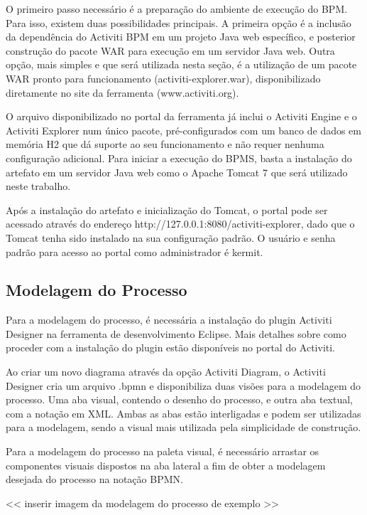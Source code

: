 O primeiro passo necessário é a preparação do ambiente de execução do BPM. Para isso, existem duas possibilidades principais. A primeira opção é a inclusão da dependência do Activiti BPM em um projeto Java web específico, e posterior construção do pacote WAR para execução em um servidor Java web. Outra opção, mais simples e que será utilizada nesta seção, é a utilização de um pacote WAR pronto para funcionamento (activiti-explorer.war), disponibilizado diretamente no site da ferramenta (www.activiti.org).

O arquivo disponibilizado no portal da ferramenta já inclui o Activiti Engine e o Activiti Explorer num único pacote, pré-configurados com um banco de dados em memória H2 que dá suporte ao seu funcionamento e não requer nenhuma configuração adicional. Para iniciar a execução do BPMS, basta a instalação do artefato em um servidor Java web como o Apache Tomcat 7 que será utilizado neste trabalho.

Após a instalação do artefato e inicialização do Tomcat, o portal pode ser acessado através do endereço http://127.0.0.1:8080/activiti-explorer, dado que o Tomcat tenha sido instalado na sua configuração padrão. O usuário e senha padrão para acesso ao portal como administrador é kermit.

\subsection{Modelagem do Processo}\label{sec:activiti-automatizar_processo_modelagem}

Para a modelagem do processo, é necessária a instalação do plugin Activiti Designer na ferramenta de desenvolvimento Eclipse. Mais detalhes sobre como proceder com a instalação do plugin estão disponíveis no portal do Activiti.

Ao criar um novo diagrama através da opção Activiti Diagram, o Activiti Designer cria um arquivo .bpmn e disponibiliza duas visões para a modelagem do processo. Uma aba visual, contendo o desenho do processo, e outra aba textual, com a notação em XML. Ambas as abas estão interligadas e podem ser utilizadas para a modelagem, sendo a visual mais utilizada pela simplicidade de construção.

Para a modelagem do processo na paleta visual, é necessário arrastar os componentes visuais dispostos na aba lateral a fim de obter a modelagem desejada do processo na notação BPMN.

<< inserir imagem da modelagem do processo de exemplo >>


